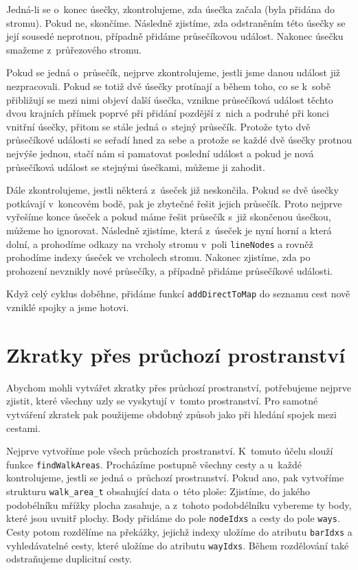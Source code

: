Jedná-li se o~konec úsečky, zkontrolujeme, zda úsečka začala (byla přidána do
stromu). Pokud ne, skončíme. Následně zjistíme, zda odstraněním této úsečky se
její sousedé neprotnou, případně přidáme průsečíkovou událost. Nakonec úsečku
smažeme z~průřezového stromu.

Pokud se jedná o~průsečík, nejprve zkontrolujeme, jestli jsme danou událost již
nezpracovali. Pokud se totiž dvě úsečky protínají a během toho, co se k~sobě
přibližují se mezi nimi objeví další úsečka, vznikne průsečíková událost těchto
dvou krajních přímek poprvé při přidání pozdější z~nich a podruhé při konci
vnitřní úsečky, přitom se stále jedná o~stejný průsečík. Protože tyto dvě
průsečíkové události se seřadí hned za sebe a protože se každé dvě úsečky
protnou nejvýše jednou, stačí nám si pamatovat poslední událost a pokud je nová
průsečíková událost se stejnými úsečkami, můžeme ji zahodit.

Dále zkontrolujeme, jestli některá z~úseček již neskončila. Pokud se dvě úsečky
potkávají v~koncovém bodě, pak je zbytečné řešit jejich průsečík. Proto nejprve
vyřešíme konce úseček a pokud máme řešit průsečík s~již skončenou úsečkou,
můžeme ho ignorovat. Následně zjistíme, která z~úseček je nyní horní a která
dolní, a prohodíme odkazy na vrcholy stromu v~poli \verb|lineNodes| a rovněž
prohodíme indexy úseček ve vrcholech stromu. Nakonec zjistíme, zda po prohození
nevznikly nové průsečíky, a případně přidáme průsečíkové události.

Když celý cyklus doběhne, přidáme funkcí \verb|addDirectToMap| do seznamu cest
nově vzniklé spojky a jsme hotovi.


\section{Zkratky přes průchozí prostranství}
Abychom mohli vytvářet zkratky přes průchozí prostranství, potřebujeme nejprve
zjistit, které všechny uzly se vyskytují v~tomto prostranství. Pro samotné
vytváření zkratek pak použijeme obdobný způsob jako při hledání spojek mezi
cestami. 

Nejprve vytvoříme pole všech průchozích prostranství.  K~tomuto účelu
slouží funkce \verb|findWalkAreas|. Procházíme postupně všechny cesty a u~každé
kontrolujeme, jestli se jedná o~průchozí prostranství. Pokud ano, pak vytvoříme
strukturu \verb|walk_area_t| obsahující data o~této ploše: Zjistíme, do jakého
podobélníku mřížky plocha zasahuje, a z~tohoto podobdélníku vybereme ty body,
které jsou uvnitř plochy. Body přidáme do pole \verb|nodeIdxs| a cesty do pole
\verb|ways|. Cesty potom rozdělíme na překážky, jejichž indexy uložíme do
atributu \verb|barIdxs| a vyhledávatelné cesty, které uložíme do atributu
\verb|wayIdxs|. Během rozdělování také odstraňujeme duplicitní cesty. 

